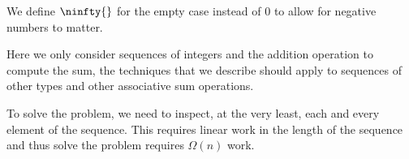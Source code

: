 \begin{cluster}
\label{grp:tch:mcss::define}

\begin{teachnote}
\label{tch:mcss::define}
We define $\ninfty{}$ for the empty case instead of $0$ to allow for
negative numbers to matter.

\end{teachnote}
\end{cluster}

\begin{cluster}
\label{grp:nt:mcss::consider}

\begin{note}
\label{nt:mcss::consider}
Here we only consider sequences of integers and the addition operation
to compute the sum, the techniques that we describe should apply to
sequences of other types and other associative sum operations.

\end{note}
\end{cluster}

\begin{cluster}
\label{grp:grm:mcss::lower-bound}

\begin{gram}
\label{grm:mcss::lower-bound}
To solve the \MCSS{} problem, we need to inspect, at the very least, each and  every element of the sequence.  This requires linear work in the length of the sequence and thus   solve the \MCSS{} problem requires $\Omega(n)$  work.

\end{gram}
\end{cluster}

